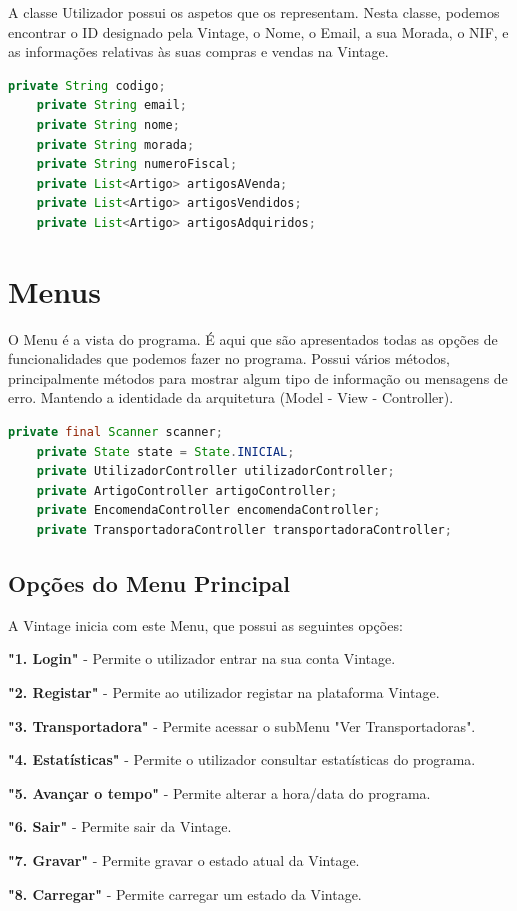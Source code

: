 \documentclass[a4paper]{report}
\begin{document}
    A classe Utilizador possui os aspetos que os representam. Nesta classe, podemos encontrar o ID designado pela Vintage, o Nome, o Email, a sua Morada, o NIF, e as informações relativas às suas compras e vendas na Vintage.
    
    \begin{lstlisting}[language=java]
    private String codigo;
    private String email;
    private String nome;
    private String morada;
    private String numeroFiscal;
    private List<Artigo> artigosAVenda;
    private List<Artigo> artigosVendidos;
    private List<Artigo> artigosAdquiridos;
    \end{lstlisting}
    
    \section{Menus}

    O Menu é a vista do programa. É aqui que são apresentados todas as opções de funcionalidades que podemos fazer no programa. Possui vários métodos, principalmente métodos para mostrar algum tipo de informação ou mensagens de erro. Mantendo a identidade da arquitetura (Model - View - Controller).
    
    \begin{lstlisting}[language=java]
    private final Scanner scanner;
    private State state = State.INICIAL;
    private UtilizadorController utilizadorController;
    private ArtigoController artigoController;
    private EncomendaController encomendaController;
    private TransportadoraController transportadoraController;
    \end{lstlisting}
    
    \subsection{Opções do Menu Principal}
    
    A Vintage inicia com este Menu, que possui as seguintes opções:
    \par      
    \textbf{ "1. Login"} - Permite o utilizador entrar na sua conta Vintage.
    \par
    \textbf{"2. Registar"} - Permite ao utilizador registar na plataforma Vintage.
    \par
    \textbf{"3. Transportadora"} - Permite acessar o subMenu "Ver Transportadoras".
    \par
    \textbf{"4. Estatísticas"} - Permite o utilizador consultar estatísticas do programa.
    \par
    \textbf{"5. Avançar o tempo"} - Permite alterar a hora/data do programa.
    \par
    \textbf{"6. Sair"} - Permite sair da Vintage.
    \par
    \textbf{"7. Gravar"} - Permite gravar o estado atual da Vintage.
    \par
    \textbf{"8. Carregar"} - Permite carregar um estado da Vintage.
    \par
\end{document}
